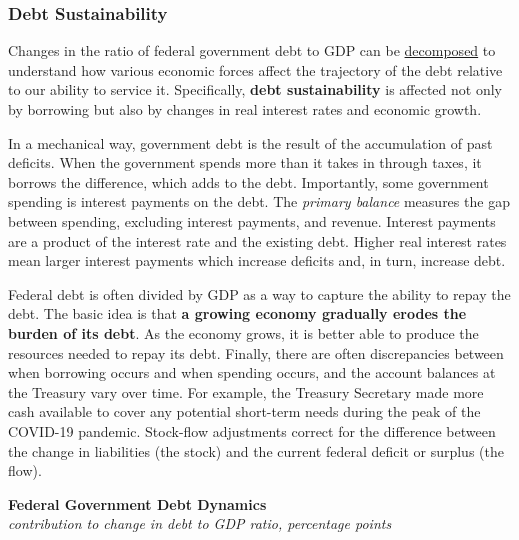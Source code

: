 \documentclass{report}
\begin{document}
{\begin{minipage}{0.76\textwidth}
\small 
\end{minipage}
\newpage
\begin{minipage}{0.76\textwidth}   
\subsubsection*{Debt Sustainability}
\small Changes in the ratio of federal government debt to GDP can be \href{https://www.imf.org/en/Publications/TNM/Issues/2016/12/31/A-Practical-Guide-to-Public-Debt-Dynamics-Fiscal-Sustainability-and-Cyclical-Adjustment-of-23498}{decomposed} to understand how various economic forces affect the trajectory of the debt relative to our ability to service it. Specifically, \textbf{debt sustainability} is affected not only by borrowing but also by changes in real interest rates and economic growth. 

In a mechanical way, government debt is the result of the accumulation of past deficits. When the government spends more than it takes in through taxes, it borrows the difference, which adds to the debt. Importantly, some government spending is interest payments on the debt. The \textit{primary balance} measures the gap between spending, excluding interest payments, and revenue. Interest payments are a product of the interest rate and the existing debt. Higher real interest rates mean larger interest payments which increase deficits and, in turn, increase debt.

Federal debt is often divided by GDP as a way to capture the ability to repay the debt. The basic idea is that \textbf{a growing economy gradually erodes the burden of its debt}. As the economy grows, it is better able to produce the resources needed to repay its debt. Finally, there are often discrepancies between when borrowing occurs and when spending occurs, and the account balances at the Treasury vary over time. For example, the Treasury Secretary made more cash available to cover any potential short-term needs during the peak of the COVID-19 pandemic. Stock-flow adjustments correct for the difference between the change in liabilities (the stock) and the current federal deficit or surplus (the flow).


\vspace{2mm}

\normalsize \textbf{Federal Government Debt Dynamics}\\
\footnotesize{\textit{contribution to change in debt to GDP ratio, percentage points}}
\vspace{5.6cm}


\end{minipage}}
\end{document}
